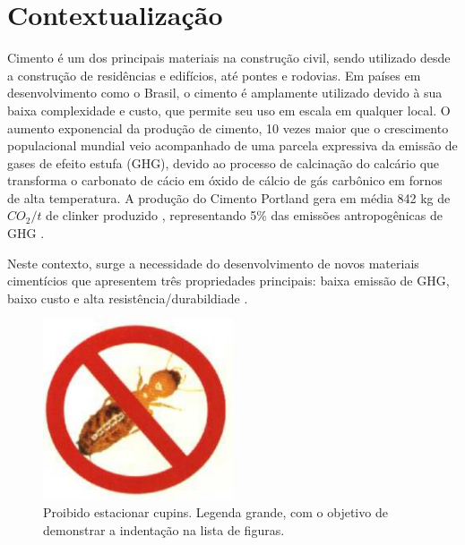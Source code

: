 \section{Contextualização}

Cimento é um dos principais materiais na construção civil, sendo utilizado desde a construção de residências e edifícios, até pontes e rodovias. Em países em desenvolvimento como o Brasil, o cimento é amplamente utilizado devido à sua baixa complexidade e custo, que permite seu uso em escala em qualquer local. O aumento exponencial da produção de cimento, 10 vezes maior que o crescimento populacional mundial \cite{united1995world} veio acompanhado de uma parcela expressiva da emissão de gases de efeito estufa (GHG), devido ao processo de calcinação do calcário que transforma o carbonato de cácio em óxido de cálcio de gás carbônico em fornos de alta temperatura. A produção do Cimento Portland gera em média 842 kg de $CO_2/t$ de clinker produzido \cite{andrew2018global}, representando 5\% das emissões antropogênicas de GHG \cite{IEA_WBCSD_2009}.

Neste contexto, surge a necessidade do desenvolvimento de novos materiais cimentícios que apresentem três propriedades principais: baixa emissão de GHG, baixo custo e alta resistência/durabildiade \cite{scrivener2018eco}.

\begin{figure}[ht]
\centering
\includegraphics[width=0.5\textwidth]{Cap1/cupim}
\caption{Proibido estacionar cupins. Legenda grande, com o objetivo de demonstrar a indentação na lista de figuras.}
\label{cupim}
\end{figure}